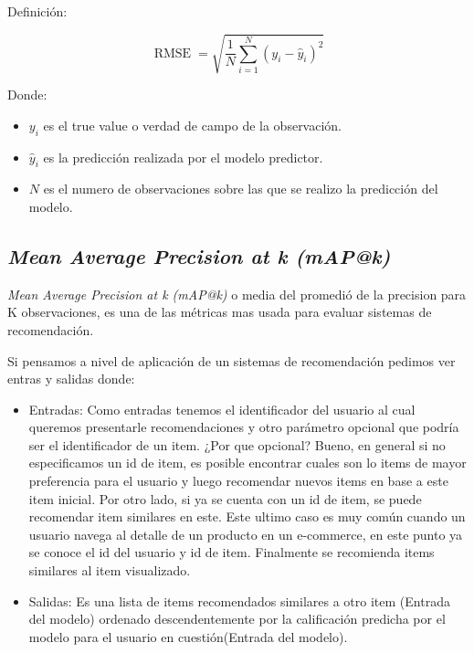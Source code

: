 \documentclass[11pt,a4paper,twoside]{thesis}
\begin{document}
\begin{description}
	\item[Definición:]
\end{description}
\begin{equation*}
	\operatorname{RMSE}=\sqrt{  \frac{1}{N} \sum_{i=1}^N (y_i - \hat y_i)^2}
\end{equation*}
\begin{description}
	\item[Donde:]
\end{description}
\begin{itemize}
	\item $y_i$ es el true value o verdad de campo de la observación.
	\item $\hat y_i$ es la predicción realizada por el modelo predictor.
	\item $N$ es el numero de observaciones sobre las que se realizo la predicción del modelo.
\end{itemize}

\subsection{\textit{Mean Average Precision at k (mAP@k)}}

\textit{Mean Average Precision at k (mAP@k)} o media del promedió de la precision para K observaciones, es una de las métricas mas usada para evaluar sistemas de recomendación.

Si pensamos a nivel de aplicación de un sistemas de recomendación pedimos ver entras y salidas donde:


\begin{itemize}
\item Entradas: Como entradas tenemos el identificador del usuario al cual queremos presentarle recomendaciones y otro parámetro opcional que podría ser el identificador de un item. ¿Por que opcional? Bueno, en general si no especificamos un id de item, es posible encontrar cuales son lo items de mayor preferencia para el usuario y luego recomendar nuevos items en base a este item inicial. Por otro lado, si ya se cuenta con un id de item, se puede recomendar item similares en este. Este ultimo caso es muy común cuando un usuario navega al detalle de un producto en un e-commerce, en este punto ya se conoce el id del usuario y id de item. Finalmente se recomienda items similares al item visualizado.
\item Salidas: Es una lista de items recomendados similares a otro item (Entrada del modelo) ordenado descendentemente por la calificación predicha por el modelo para el usuario en cuestión(Entrada del modelo). 
\end{itemize}
\end{document}
